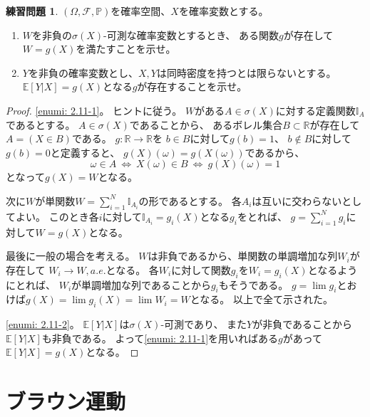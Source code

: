 \documentclass[uplatex]{jsarticle}
\theoremstyle{definition}
\newtheorem{prob}[prob]{練習問題}
\def\R{\mathbb{R}}
\def\P{\mathbb{P}}
\def\E{\mathbb{E}}
\def\I{\mathbb{I}}
\def\mcF{\mathcal{F}}
\begin{document}
\begin{prob}\label{prob: 2.11}
  \((\Omega,\mcF,\P)\)を確率空間、\(X\)を確率変数とする。
  \begin{enumerate}
    \item \label{enumi: 2.11-1}
    \(W\)を非負の\(\sigma(X)\)-可測な確率変数とするとき、
    ある関数\(g\)が存在して\(W=g(X)\)を満たすことを示せ。
    \item \label{enumi: 2.11-2}
    \(Y\)を非負の確率変数とし、\(X,Y\)は同時密度を持つとは限らないとする。
    \(\E[Y|X] = g(X)\)となる\(g\)が存在することを示せ。
  \end{enumerate}
\end{prob}


\begin{proof}
  \ref{enumi: 2.11-1}。
  ヒントに従う。
  \(W\)がある\(A\in \sigma(X)\)に対する定義関数\(\I_A\)であるとする。
  \(A\in \sigma(X)\)であることから、
  あるボレル集合\(B\subset \R\)が存在して
  \(A = (X\in B)\)である。
  \(g:\R\to \R\)を
  \(b\in B\)に対して\(g(b)=1\)、
  \(b\not\in B\)に対して\(g(b)=0\)と定義すると、
  \(g(X)(\omega) = g(X(\omega))\)であるから、
  \[\omega\in A \ \iff \ X(\omega)\in B \ \iff \ g(X)(\omega) = 1\]
  となって\(g(X) = W\)となる。

  次に\(W\)が単関数\(W=\sum_{i=1}^N \I_{A_i}\)の形であるとする。
  各\(A_i\)は互いに交わらないとしてよい。
  このとき各\(i\)に対して\(\I_{A_i}=g_i(X)\)となる\(g_i\)をとれば、
  \(g = \sum_{i=1}^Ng_i\)に対して\(W = g(X)\)となる。

  最後に一般の場合を考える。
  \(W\)は非負であるから、単関数の単調増加な列\(W_i\)が存在して
  \(W_i\to W , a.e.\)となる。
  各\(W_i\)に対して関数\(g_i\)を\(W_i = g_i(X)\)となるようにとれば、
  \(W_i\)が単調増加な列であることから\(g_i\)もそうである。
  \(g=\lim g_i\)とおけば\(g(X) = \lim g_i(X) = \lim W_i = W\)となる。
  以上で全て示された。


  \ref{enumi: 2.11-2}。
  \(\E[Y|X]\)は\(\sigma(X)\)-可測であり、
  また\(Y\)が非負であることから\(\E[Y|X]\)も非負である。
  よって\ref{enumi: 2.11-1}を用いればある\(g\)があって
  \(\E[Y|X] = g(X)\)となる。
\end{proof}










\newpage

\section{ブラウン運動}\label{section: 3}
\end{document}
